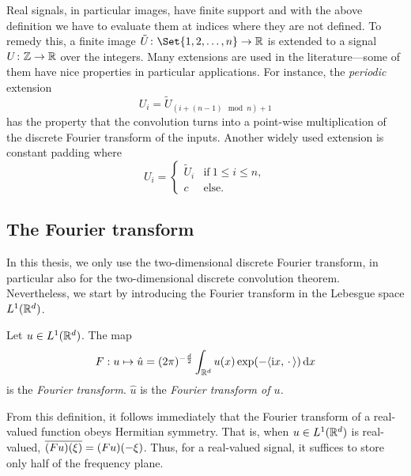 Real signals, in particular images, have finite support and with the above definition we have to evaluate them at indices where they are not defined.
To remedy this, a finite image \( \map{\tilde{U}}{\Set{\num{1},\num{2},\dotsc,n}}{\R} \) is extended to a signal \( U \colon \mathbb{Z} \to \mathbb{R} \) over the integers.
Many extensions are used in the literature---some of them have nice properties in particular applications.
For instance, the \emph{periodic} extension
\begin{equation}
	U_{i} = \tilde{U}_{(i + (n - \num{1}) \mod n) + \num{1}}
\end{equation}
has the property that the convolution turns into a point-wise multiplication of the discrete Fourier transform of the inputs.
Another widely used extension is constant padding where
\begin{equation}
	U_i = \begin{cases}
		\tilde{U}_i & \text{if}\ \num{1} \leq i \leq n, \\
		c & \text{else}.
	\end{cases}
\end{equation}
\subsection{The Fourier transform}
\label{ssec:fourier transform}
In this thesis, we only use the two-dimensional discrete Fourier transform, in particular also for the two-dimensional discrete convolution theorem.
Nevertheless, we start by introducing the Fourier transform in the Lebesgue space \( L^1(\mathbb{R}^d) \).

\begin{definition}%
	\label{def:fourier transform}
	Let \( u \in L^1(\mathbb{R}^d) \). The map
	\begin{equation}
		\begin{aligned}
			F : u \mapsto \hat{u} = (2\pi)^{-\frac{d}{2}} \int_{\mathbb{R}^d} u(x) \exp(-\langle \mathrm{i} x, \,\cdot\, \rangle)\,\mathrm{d}x
		\end{aligned}
	\end{equation}
	is the \emph{Fourier transform}.
	\( \hat{u} \) is the \emph{Fourier transform of \( u \).}
\end{definition}
From this definition, it follows immediately that the Fourier transform of a real-valued function obeys Hermitian symmetry.
That is, when \( u \in L^1(\mathbb{R}^d) \) is real-valued, \( \overline{(F u)(\xi)} = (F u)(-\xi) \).
Thus, for a real-valued signal, it suffices to store only half of the frequency plane.
